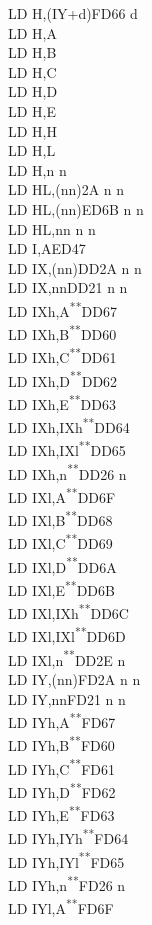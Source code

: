 \documentclass[12pt,twoside,openright,a4paper]{book}
\newcommand{\UNDOC}{\textnormal{\textsuperscript{**}}}
\begin{document}
\begin{multicols}{3}
{\begin{tabbing}
	LD H,(IY+d)\>FD66 d\\
	LD H,A\\
	LD H,B\\
	LD H,C\\
	LD H,D\\
	LD H,E\\
	LD H,H\\
	LD H,L\\
	LD H,n n\\
	LD HL,(nn)\>2A n n\\
	LD HL,(nn)\>ED6B n n\\
	LD HL,nn n n\\
	LD I,A\>ED47\\
	LD IX,(nn)\>DD2A n n\\
	LD IX,nn\>DD21 n n\\
	LD IXh,A\UNDOC\>DD67\\
	LD IXh,B\UNDOC\>DD60\\
	LD IXh,C\UNDOC\>DD61\\
	LD IXh,D\UNDOC\>DD62\\
	LD IXh,E\UNDOC\>DD63\\
	LD IXh,IXh\UNDOC\>DD64\\
	LD IXh,IXl\UNDOC\>DD65\\
	LD IXh,n\UNDOC\>DD26 n \\
	LD IXl,A\UNDOC\>DD6F\\
	LD IXl,B\UNDOC\>DD68\\
	LD IXl,C\UNDOC\>DD69\\
	LD IXl,D\UNDOC\>DD6A\\
	LD IXl,E\UNDOC\>DD6B\\
	LD IXl,IXh\UNDOC\>DD6C\\
	LD IXl,IXl\UNDOC\>DD6D\\
	LD IXl,n\UNDOC\>DD2E n\\
	LD IY,(nn)\>FD2A n n\\
	LD IY,nn\>FD21 n n\\
	LD IYh,A\UNDOC\>FD67\\
	LD IYh,B\UNDOC\>FD60\\
	LD IYh,C\UNDOC\>FD61\\
	LD IYh,D\UNDOC\>FD62\\
	LD IYh,E\UNDOC\>FD63\\
	LD IYh,IYh\UNDOC\>FD64\\
	LD IYh,IYl\UNDOC\>FD65\\
	LD IYh,n\UNDOC\>FD26 n\\
	LD IYl,A\UNDOC\>FD6F\\

\end{tabbing}}
\end{multicols}
\end{document}
